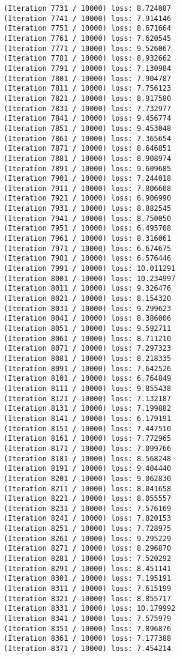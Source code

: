 \documentclass[11pt]{article}
\begin{document}
\begin{Verbatim}[commandchars=\\\{\}]
(Iteration 7731 / 10000) loss: 8.724087
(Iteration 7741 / 10000) loss: 7.914146
(Iteration 7751 / 10000) loss: 8.671664
(Iteration 7761 / 10000) loss: 7.620545
(Iteration 7771 / 10000) loss: 9.526067
(Iteration 7781 / 10000) loss: 8.932662
(Iteration 7791 / 10000) loss: 7.130984
(Iteration 7801 / 10000) loss: 7.904787
(Iteration 7811 / 10000) loss: 7.756123
(Iteration 7821 / 10000) loss: 8.917580
(Iteration 7831 / 10000) loss: 7.732977
(Iteration 7841 / 10000) loss: 9.456774
(Iteration 7851 / 10000) loss: 9.453048
(Iteration 7861 / 10000) loss: 7.365654
(Iteration 7871 / 10000) loss: 8.646851
(Iteration 7881 / 10000) loss: 8.908974
(Iteration 7891 / 10000) loss: 9.609685
(Iteration 7901 / 10000) loss: 7.244018
(Iteration 7911 / 10000) loss: 7.806608
(Iteration 7921 / 10000) loss: 6.906990
(Iteration 7931 / 10000) loss: 8.882545
(Iteration 7941 / 10000) loss: 8.750050
(Iteration 7951 / 10000) loss: 6.495708
(Iteration 7961 / 10000) loss: 8.316061
(Iteration 7971 / 10000) loss: 6.674675
(Iteration 7981 / 10000) loss: 6.576446
(Iteration 7991 / 10000) loss: 10.011291
(Iteration 8001 / 10000) loss: 10.234997
(Iteration 8011 / 10000) loss: 9.326476
(Iteration 8021 / 10000) loss: 8.154320
(Iteration 8031 / 10000) loss: 9.299623
(Iteration 8041 / 10000) loss: 8.386006
(Iteration 8051 / 10000) loss: 9.592711
(Iteration 8061 / 10000) loss: 8.711210
(Iteration 8071 / 10000) loss: 7.297323
(Iteration 8081 / 10000) loss: 8.218335
(Iteration 8091 / 10000) loss: 7.642526
(Iteration 8101 / 10000) loss: 6.764849
(Iteration 8111 / 10000) loss: 9.855438
(Iteration 8121 / 10000) loss: 7.132187
(Iteration 8131 / 10000) loss: 7.199882
(Iteration 8141 / 10000) loss: 6.179191
(Iteration 8151 / 10000) loss: 7.447510
(Iteration 8161 / 10000) loss: 7.772965
(Iteration 8171 / 10000) loss: 7.099766
(Iteration 8181 / 10000) loss: 8.568248
(Iteration 8191 / 10000) loss: 9.404440
(Iteration 8201 / 10000) loss: 9.062830
(Iteration 8211 / 10000) loss: 8.041658
(Iteration 8221 / 10000) loss: 8.055557
(Iteration 8231 / 10000) loss: 7.576169
(Iteration 8241 / 10000) loss: 7.820153
(Iteration 8251 / 10000) loss: 7.728975
(Iteration 8261 / 10000) loss: 9.295229
(Iteration 8271 / 10000) loss: 8.296870
(Iteration 8281 / 10000) loss: 7.520292
(Iteration 8291 / 10000) loss: 8.451141
(Iteration 8301 / 10000) loss: 7.195191
(Iteration 8311 / 10000) loss: 7.615199
(Iteration 8321 / 10000) loss: 8.855717
(Iteration 8331 / 10000) loss: 10.179992
(Iteration 8341 / 10000) loss: 7.575979
(Iteration 8351 / 10000) loss: 7.896876
(Iteration 8361 / 10000) loss: 7.177388
(Iteration 8371 / 10000) loss: 7.454214

\end{Verbatim}
\end{document}
